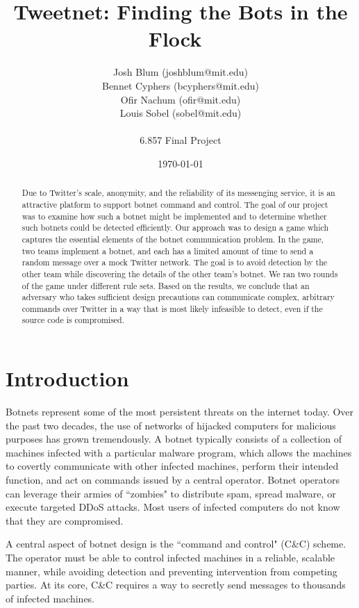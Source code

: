 \documentclass[11pt, oneside]{article} %
\title{ 
Tweetnet: Finding the Bots in the Flock\
}
\author{
Josh Blum (joshblum@mit.edu)\\
Bennet Cyphers (bcyphers@mit.edu)\\
Ofir Nachum (ofir@mit.edu)\\
Louis Sobel (sobel@mit.edu)\\
\\
6.857 Final Project
\date{\today}
}
\numberwithin{equation}{section} %
\numberwithin{figure}{section} %
\numberwithin{table}{section} %
\begin{document}
\maketitle

\vspace{4em}

\begin{abstract}
    Due to Twitter's scale, anonymity, and the reliability of its messenging service, it is an attractive platform to support botnet command and control. The goal of our project was to examine how such a botnet might be implemented and to determine whether such botnets could be detected efficiently. Our approach was to design a game which captures the essential elements of the botnet communication problem. In the game, two teams implement a botnet, and each has a limited amount of time to send a random message over a mock Twitter network. The goal is to avoid detection by the other team while discovering the details of the other team's botnet. We ran two rounds of the game under different rule sets. Based on the results, we conclude that an adversary who takes sufficient design precautions can communicate complex, arbitrary commands over Twitter in a way that is most likely infeasible to detect, even if the source code is compromised.
\end{abstract}

\clearpage

\section {Introduction}
Botnets represent some of the most persistent threats on the internet today. Over the past two decades, the use of networks of hijacked computers for malicious purposes has grown tremendously. A botnet typically consists of a collection of machines infected with a particular malware program, which allows the machines to covertly communicate with other infected machines, perform their intended function, and act on commands issued by a central operator. Botnet operators can leverage their armies of ``zombies" to distribute spam, spread malware, or execute targeted DDoS attacks. Most users of infected computers do not know that they are compromised.

A central aspect of botnet design is the ``command and control" (C\&C) scheme. The operator must be able to control infected machines in a reliable, scalable manner, while avoiding detection and preventing intervention from competing parties. At its core, C\&C requires a way to secretly send messages to thousands of infected machines.
\end{document}
